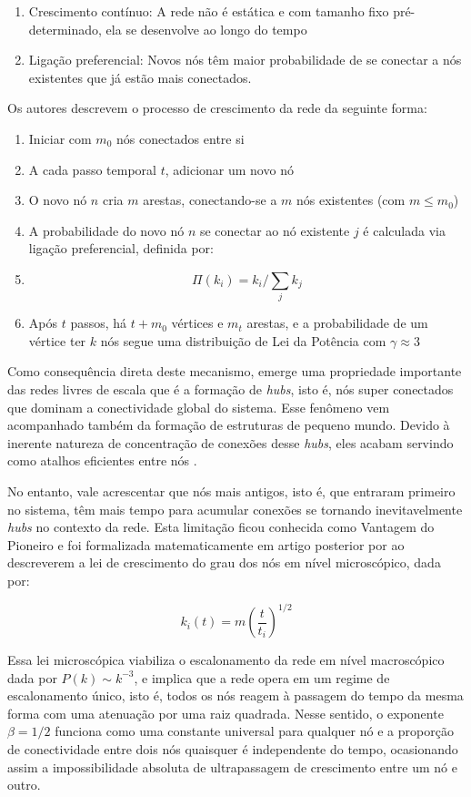 \documentclass[12pt,oneside,a4paper,brazil,sumario=tradicional]{abntex2}
\begin{document}
\begin{enumerate}
  \item Crescimento contínuo: A rede não é estática e com tamanho fixo pré-determinado, ela se desenvolve ao longo do tempo
  \item Ligação preferencial: Novos nós têm maior probabilidade de se conectar a nós existentes que já estão mais conectados.
\end{enumerate}

Os autores descrevem o processo de crescimento da rede da seguinte forma:

\begin{enumerate}
  \item Iniciar com $m_{0}$ nós conectados entre si
  \item A cada passo temporal $t$, adicionar um novo nó
  \item O novo nó $n$ cria $m$ arestas, conectando-se a $m$ nós existentes (com $m \le m_{0}$)
  \item A probabilidade do novo nó $n$ se conectar ao nó existente $j$ é calculada via ligação preferencial, definida por:
  \item[] \[\Pi(k_{i}) = k_{i} / \sum_{j} k_{j}\]
  \item Após $t$ passos, há $t + m_{0}$ vértices e $m_{t}$ arestas, e a probabilidade de um vértice ter $k$ nós segue uma distribuição de Lei da Potência com $\gamma \approx 3$
\end{enumerate}

Como consequência direta deste mecanismo, emerge uma propriedade importante das redes livres de escala que é a formação de \textit{hubs}, isto é, nós super conectados que dominam a conectividade global do sistema. Esse fenômeno vem acompanhado também da formação de estruturas de pequeno mundo. Devido à inerente natureza de concentração de conexões desse \textit{hubs}, eles acabam servindo como atalhos eficientes entre nós \parencite{wang2003}.

No entanto, vale acrescentar que nós mais antigos, isto é, que entraram primeiro no sistema, têm mais tempo para acumular conexões se tornando inevitavelmente \textit{hubs} no contexto da rede. Esta limitação ficou conhecida como Vantagem do Pioneiro e foi formalizada matematicamente em artigo posterior por \textcite{barabasi1999b} ao descreverem a lei de crescimento do grau dos nós em nível microscópico, dada por:

\[k_{i}(t) = m\left(\frac{t}{t_{i}}\right)^{1/2}\]

Essa lei microscópica viabiliza o escalonamento da rede em nível macroscópico dada por $P(k) \sim k^{-3}$, e implica que a rede opera em um regime de escalonamento único, isto é, todos os nós reagem à passagem do tempo da mesma forma com uma atenuação por uma raiz quadrada. Nesse sentido, o exponente $\beta = 1/2$ funciona como uma constante universal para qualquer nó e a proporção de conectividade entre dois nós quaisquer é independente do tempo, ocasionando assim a impossibilidade absoluta de ultrapassagem de crescimento entre um nó e outro.
\end{document}
